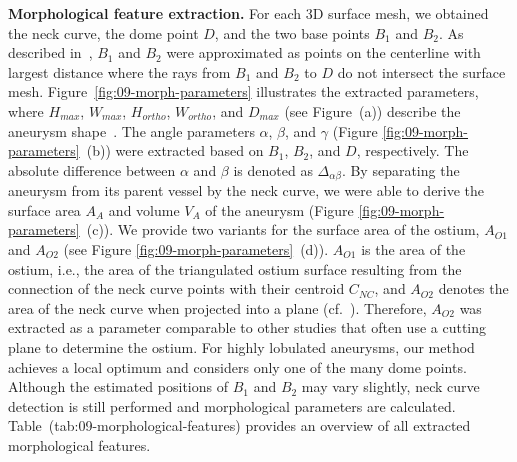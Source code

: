 \documentclass[
  oneside]{book}
\begin{document}
\textbf{Morphological feature extraction.}
For each 3D surface mesh, we obtained the neck curve, the dome point \(D\), and the two base points \(B_1\) and \(B_2\).
As described in~\autocite{Saalfeld2018}, \(B_1\) and \(B_2\) were approximated as points on the centerline with largest distance where the rays from \(B_1\) and \(B_2\) to \(D\) do not intersect the surface mesh.
Figure~\ref{fig:09-morph-parameters} illustrates the extracted parameters, where \(H_{max}\), \(W_{max}\), \(H_{ortho}\), \(W_{ortho}\), and \(D_{max}\) (see Figure~(a)) describe the aneurysm shape~\autocite{Dhar2008,LauricEtAl:Neurosurgery2012}.
The angle parameters \(\alpha\), \(\beta\), and \(\gamma\) (Figure \ref{fig:09-morph-parameters}~(b)) were extracted based on \(B_1\), \(B_2\), and \(D\), respectively.
The absolute difference between \(\alpha\) and \(\beta\) is denoted as \(\Delta_{\alpha\beta}\).
By separating the aneurysm from its parent vessel by the neck curve, we were able to derive the surface area \(A_A\) and volume \(V_A\) of the aneurysm (Figure \ref{fig:09-morph-parameters}~(c)).
We provide two variants for the surface area of the ostium, \(A_{O1}\) and \(A_{O2}\) (see Figure \ref{fig:09-morph-parameters}~(d)).
\(A_{O1}\) is the area of the ostium, i.e., the area of the triangulated ostium surface resulting from the connection of the neck curve points with their centroid \(C_{NC}\), and \(A_{O2}\) denotes the area of the neck curve when projected into a plane (cf.~\autocite{Saalfeld2018}).
Therefore, \(A_{O2}\) was extracted as a parameter comparable to other studies that often use a cutting plane to determine the ostium.
For highly lobulated aneurysms, our method achieves a local optimum and considers only one of the many dome points.
Although the estimated positions of \(B_1\) and \(B_2\) may vary slightly, neck curve detection is still performed and morphological parameters are calculated. Table~(tab:09-morphological-features) provides an overview of all extracted morphological features.
\end{document}
